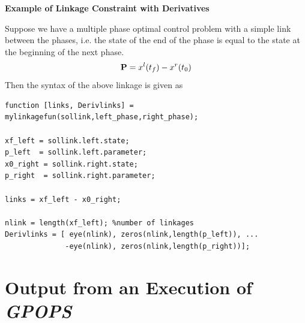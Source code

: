 \documentclass[10pt]{article}
\newcommand{\gpops}{{\em GPOPS}~}
\newenvironment{shadedframe}{%
  \def\FrameCommand{\fcolorbox{black}{shadecolor}}%
  \MakeFramed {\FrameRestore}}
{\endMakeFramed}
\begin{document}
\scriptsize
\begin{shadedframe}
{\noindent}{\bf Example of Linkage Constraint with Derivatives}
\vspace{12pt}

{\noindent}Suppose we have a multiple phase optimal control problem with a simple link between the phases, i.e. the state of the end of the phase is equal to the state at the beginning of the next phase.  \begin{displaymath}
\mathbf{P} = x^l(t_f) - x^r(t_0)
\end{displaymath}
Then the syntax of the above linkage is given as
\begin{verbatim}
function [links, Derivlinks] = mylinkagefun(sollink,left_phase,right_phase);

xf_left = sollink.left.state;
p_left  = sollink.left.parameter;
x0_right = sollink.right.state;
p_right  = sollink.right.parameter;

links = xf_left - x0_right;

nlink = length(xf_left); %number of linkages
Derivlinks = [ eye(nlink), zeros(nlink,length(p_left)), ...
              -eye(nlink), zeros(nlink,length(p_right))];
\end{verbatim}
\end{shadedframe}
\normalsize

\section{Output from an Execution of \gpops\label{sect:output}}
\end{document}
